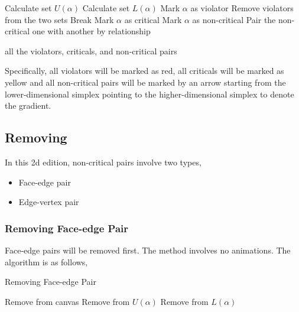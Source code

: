 \documentclass[12pt]{article}
\begin{document}
\begin{algorithm}
	\caption{}\label{v2}
	\begin{algorithmic}[0]
	        \State Calculate set $U(\alpha)$
	        \State Calculate set $L(\alpha)$
	    \EndFor
	            \State Mark $\alpha$ as violator
	            \EndIf
	        \EndFor
	        \State Remove violators from the two sets
	            \State Break
	        \EndIf
	    \EndFor
	        \State Mark $\alpha$ as critical
	        \EndIf
	        \State Mark $\alpha$ as non-critical
	        \EndIf
	    \EndFor
	    \State Pair the non-critical one with another by relationship
	    
		\Return all the violators, criticals, and non-critical pairs
		\EndFunction
	\end{algorithmic}
\end{algorithm}

Specifically, all violators will be marked as red, all criticals will be marked as yellow and all non-critical pairs will be marked by an arrow starting from the lower-dimensional simplex pointing to the higher-dimensional simplex to denote the gradient.

\subsection{Removing}
In this 2d edition, non-critical pairs involve two types,
\begin{itemize}
    \item Face-edge pair
    \item Edge-vertex pair
\end{itemize}

\subsubsection{Removing Face-edge Pair}
Face-edge pairs will be removed first. The method involves no animations. The algorithm is as follows,

\begin{algorithm}
	\caption{Removing Face-edge Pair}\label{v3}
	\begin{algorithmic}[0]
	        \State Remove from canvas
	        \State Remove from $U(\alpha)$
	        \State Remove from $L(\alpha)$
	    \EndFor
		\EndFunction
	\end{algorithmic}
\end{algorithm}
\end{document}
